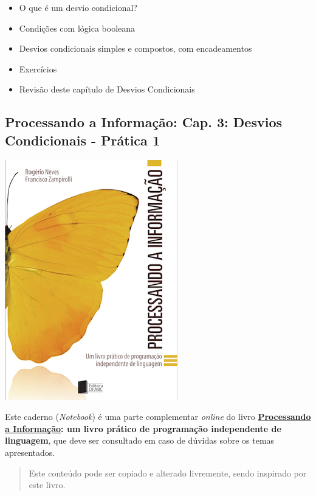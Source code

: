 \documentclass[12pt,a4paper]{article}
\providecommand{\tightlist}{%
      \setlength{\itemsep}{0pt}\setlength{\parskip}{0pt}}
\begin{document}
\begin{itemize}
\tightlist
\item
  O que é um desvio condicional?
\item
  Condições com lógica booleana
\item
  Desvios condicionais simples e compostos, com encadeamentos
\item
  Exercícios
\item
  Revisão deste capítulo de Desvios Condicionais
\end{itemize}

    \hypertarget{processando-a-informauxe7uxe3o-cap.-3-desvios-condicionais---pruxe1tica-1}{%
\subsection{Processando a Informação: Cap. 3: Desvios Condicionais -
Prática
1}\label{processando-a-informauxe7uxe3o-cap.-3-desvios-condicionais---pruxe1tica-1}}

    \includegraphics{"figs/Capa_Processando_Informacao.jpg"}

Este caderno (\emph{Notebook}) é uma parte complementar \emph{online} do
livro
\textbf{\href{https://editora.ufabc.edu.br/matematica-e-ciencias-da-computacao/58-processando-a-informacao}{Processando
a Informação}: um livro prático de programação independente de
linguagem}, que deve ser consultado em caso de dúvidas sobre os temas
apresentados.

\begin{quote}
Este conteúdo pode ser copiado e alterado livremente, sendo inspirado
por este livro.
\end{quote}
\end{document}
